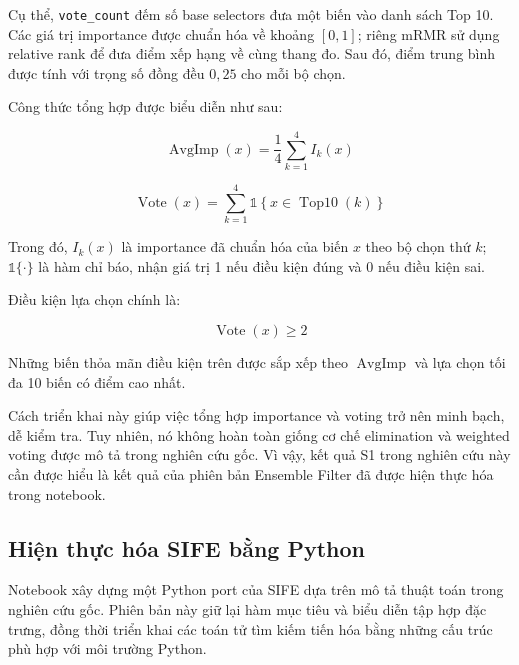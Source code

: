 Cụ thể, \texttt{vote\_count} đếm số base selectors đưa một biến
vào danh sách Top 10. Các giá trị importance được chuẩn hóa về
khoảng $[0,1]$; riêng mRMR sử dụng relative rank để đưa điểm
xếp hạng về cùng thang đo. Sau đó, điểm trung bình được tính
với trọng số đồng đều $0{,}25$ cho mỗi bộ chọn.

Công thức tổng hợp được biểu diễn như sau:

\begin{equation}
    \operatorname{AvgImp}(x)
    =
    \frac{1}{4}\sum_{k=1}^{4} I_k(x)
    \label{eq:implemented-avg-importance}
\end{equation}

\begin{equation}
    \operatorname{Vote}(x)
    =
    \sum_{k=1}^{4}
    \mathbb{1}
    \left\{
        x \in \operatorname{Top10}(k)
    \right\}
    \label{eq:implemented-voting}
\end{equation}

Trong đó, $I_k(x)$ là importance đã chuẩn hóa của biến $x$
theo bộ chọn thứ $k$; $\mathbb{1}\{\cdot\}$ là hàm chỉ báo,
nhận giá trị 1 nếu điều kiện đúng và 0 nếu điều kiện sai.

Điều kiện lựa chọn chính là:

\begin{equation}
    \operatorname{Vote}(x) \geq 2
    \label{eq:implemented-vote-threshold}
\end{equation}

Những biến thỏa mãn điều kiện trên được sắp xếp theo
$\operatorname{AvgImp}$ và lựa chọn tối đa 10 biến có điểm
cao nhất.

Cách triển khai này giúp việc tổng hợp importance và voting
trở nên minh bạch, dễ kiểm tra. Tuy nhiên, nó không hoàn toàn
giống cơ chế elimination và weighted voting được mô tả trong
nghiên cứu gốc. Vì vậy, kết quả S1 trong nghiên cứu này cần
được hiểu là kết quả của phiên bản Ensemble Filter đã được
hiện thực hóa trong notebook.

\subsection{Hiện thực hóa SIFE bằng Python}
\label{subsec:implemented-sife}

Notebook xây dựng một Python port của SIFE dựa trên mô tả
thuật toán trong nghiên cứu gốc. Phiên bản này giữ lại hàm
mục tiêu và biểu diễn tập hợp đặc trưng, đồng thời triển khai
các toán tử tìm kiếm tiến hóa bằng những cấu trúc phù hợp
với môi trường Python.

